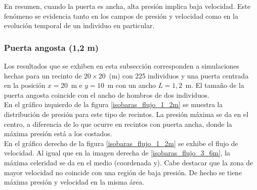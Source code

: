 En resumen, cuando la puerta es ancha, alta presión implica baja velocidad. Este fenómeno se evidencia tanto en los campos de presión y velocidad como en la evolución temporal de un individuo en particular. 

\subsubsection{Puerta angosta (1,2 m)}

Los resultados que se exhiben en esta subsección corresponden a simulaciones hechas para un recinto de  $20\times 20$~(m) con 225 individuos y una puerta centrada en la posición $x=20$~m e $y=10$~m con un ancho $L=1,2$~m. El tamaño de la puerta angosta coincide con el ancho de hombros de dos individuos.\\

En el gráfico izquierdo de la figura \ref{isobaras_flujo_1_2m} se muestra la distribución de presión para este tipo de recintos. La presión máxima se da en el centro, a diferencia de lo que ocurre en recintos con puerta ancha, donde la máxima presión está a los costados.\\

En el gráfico derecho de la figura \ref{isobaras_flujo_1_2m} se exhibe el flujo de velocidad. Al igual que en la imagen derecha de  \ref{isobaras_flujo_3_6m}, la máxima celeridad se da en el medio (coordenada y).
Cabe destacar que la zona de mayor velocidad no coincide con una región de baja presión. De hecho se tiene máxima presión y velocidad en la misma área.  

